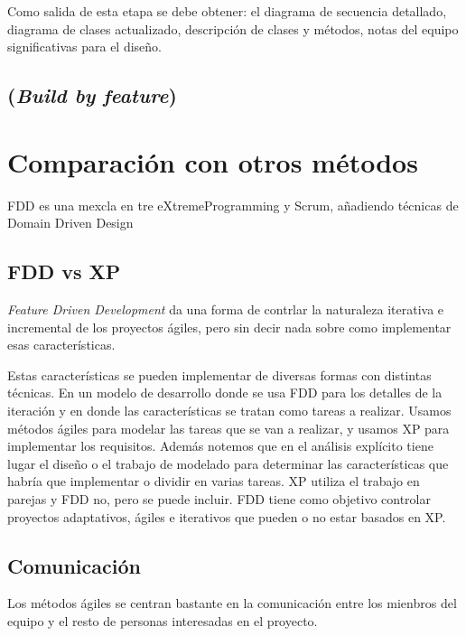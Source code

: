 \documentclass[11pt]{article}
\begin{document}
Como salida de esta etapa se debe obtener: el diagrama de secuencia detallado, diagrama de clases actualizado, descripción de clases y métodos, notas del equipo significativas para el diseño.

\subsection{(\textit{Build by feature})}



\section{Comparación con otros métodos}
FDD es una mexcla en tre eXtremeProgramming y Scrum, añadiendo técnicas de Domain Driven Design

\subsection*{FDD vs XP}
\textit{Feature Driven Development} da una forma de contrlar la naturaleza iterativa e incremental de los proyectos ágiles, pero sin decir nada sobre como implementar esas características.

Estas características se pueden implementar de diversas formas con distintas técnicas.
En un modelo de desarrollo donde se usa FDD para los detalles de la iteración y en donde las características se tratan como tareas a realizar.
Usamos métodos ágiles para modelar las tareas que se van a realizar, y usamos XP para implementar los requisitos. Además notemos que en el análisis explícito tiene lugar el diseño o el trabajo de modelado para determinar las características que habría que implementar o dividir en varias tareas. 
XP utiliza el trabajo en parejas y FDD no, pero se puede incluir. 
FDD tiene como objetivo controlar
proyectos adaptativos, ágiles e iterativos que pueden o no estar basados en XP.

\subsection*{Comunicación}
Los métodos ágiles se centran bastante en la comunicación entre los mienbros del equipo y el resto de personas interesadas en el proyecto.
\end{document}
